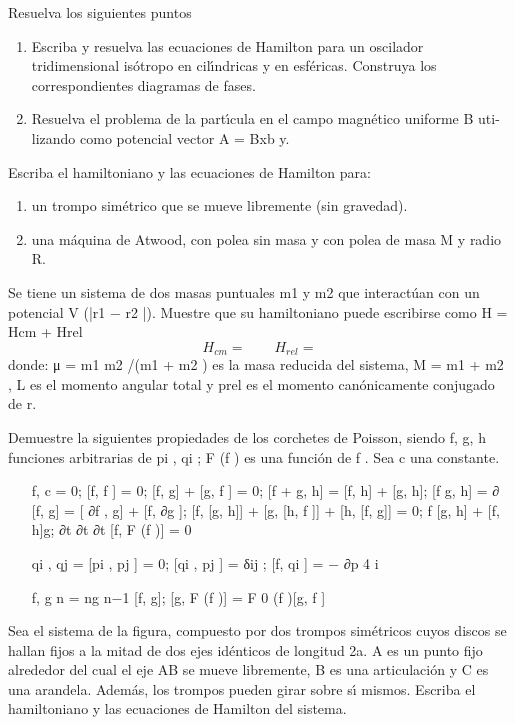 \documentclass[10pt,oneside]{CBFT_book}
\begin{document}
\begin{ejercicios}
\label{ej15}
\item{ \bf }
Resuelva los siguientes puntos
\begin{enumerate}[label=(\alph*)]
\item Escriba y resuelva las ecuaciones de Hamilton para un oscilador tridimensional
isótropo en cilı́ndricas y en esféricas. Construya los correspondientes diagramas
de fases.
\item Resuelva el problema de la partı́cula en el campo magnético uniforme B uti-
lizando como potencial vector A = Bxb y.
\end{enumerate}

\label{ej16}
\item{ \bf }
Escriba el hamiltoniano y las ecuaciones de Hamilton para:
\begin{enumerate}[label=(\alph*)]
\item un trompo simétrico que se mueve libremente (sin gravedad).
\item una máquina de Atwood, con polea sin masa y con polea de masa M y radio R.
\end{enumerate}

\label{ej17}
\item{ \bf }
Se tiene un sistema de dos masas puntuales m1 y m2 que interactúan con un potencial
V (|r1 − r2 |). Muestre que su hamiltoniano puede escribirse como H = Hcm + Hrel
\[
	H_{cm} =
	\qquad
	H_{rel} =
\]
donde: μ = m1 m2 /(m1 + m2 ) es la masa reducida del sistema, M = m1 + m2 , L es el
momento angular total y prel es el momento canónicamente conjugado de r.

\label{ej18}
\item{ \bf }
Demuestre la siguientes propiedades de los corchetes de Poisson, siendo f, g, h funciones
arbitrarias de pi , qi ; F (f ) es una función de f . Sea c una constante.
\begin{enumerate}[label=(\alph*)]
\item [f, c] = 0; [f, f ] = 0; [f, g] + [g, f ] = 0; [f + g, h] = [f, h] + [g, h]; [f g, h] =
∂ [f, g] = [ ∂f , g] + [f, ∂g ]; [f, [g, h]] + [g, [h, f ]] + [h, [f, g]] = 0;
f [g, h] + [f, h]g; ∂t ∂t ∂t [f, F (f )] = 0
\item [qi , qj ] = [pi , pj ] = 0; [qi , pj ] = δij ; [f, qi ] = − ∂p 4 i
\item [f, g n ] = ng n−1 [f, g]; [g, F (f )] = F 0 (f )[g, f ]
\end{enumerate}


\label{ej19}
\item{ \bf }
Sea el sistema de la figura, compuesto por dos trompos simétricos cuyos discos se hallan
fijos a la mitad de dos ejes idénticos de longitud 2a. A es un punto fijo alrededor del cual
el eje AB se mueve libremente, B es una articulación y C es una arandela. Además,
los trompos pueden girar sobre sı́ mismos. Escriba el hamiltoniano y las ecuaciones de
Hamilton del sistema.


\end{ejercicios}
\end{document}

